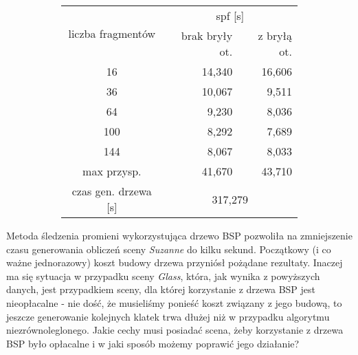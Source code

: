 \begin{figure}[!htb]
\advance\leftskip-2cm
	\begin{subfigure}{.5\textwidth}
	\end{subfigure}
	\hspace{2cm}
	\begin{subfigure}{.5\textwidth}
	\begin{longtable}{|c|r|r|} \hline
	    \multirow{2}{*}{liczba fragmentów} & \multicolumn{2}{|c|}{spf [s]} \\ \cline{2-3}
	    & brak bryły ot. & z bryłą ot. \\ \hline
	    16 & 14,340 & 16,606 \\ 
	    36 & 10,067 & 9,511 \\
		64 & 9,230 & 8,036 \\
		100 & 8,292 & 7,689 \\
		144 & 8,067 & 8,033 \\ \hline
		max przysp. & 41,670 & 43,710 \\ \hline
		czas gen. drzewa [s] &  \multicolumn{2}{|c|}{317,279} \\ \hline
	\end{longtable}
\end{subfigure}
\end{figure}

Metoda śledzenia promieni wykorzystująca drzewo BSP pozwoliła na zmniejszenie czasu generowania obliczeń sceny \emph{Suzanne} do kilku sekund. Początkowy (i co ważne jednorazowy) koszt budowy drzewa przyniósł pożądane rezultaty. Inaczej ma się sytuacja w przypadku sceny \emph{Glass}, która, jak wynika z powyższych danych, jest przypadkiem sceny, dla której korzystanie z drzewa BSP jest nieopłacalne - nie dość, że musieliśmy ponieść koszt związany z jego budową, to jeszcze generowanie kolejnych klatek trwa dłużej niż w przypadku algorytmu niezrównoleglonego. Jakie cechy musi posiadać scena, żeby korzystanie z drzewa BSP było opłacalne i w jaki sposób możemy poprawić jego działanie?

